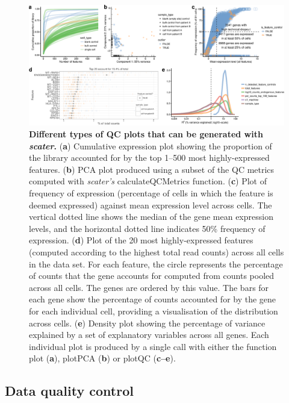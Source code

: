 \documentclass{bioinfo}
\begin{document}
\begin{figure}[!htpb]%
\centerline{\includegraphics[width=\textwidth]{figure3_alt.eps}}
\caption{\textbf{Different types of QC plots that can be generated with \emph{scater}.} (\textbf{a}) Cumulative expression plot showing the proportion of the library accounted for by the top 1--500 most highly-expressed features. (\textbf{b}) PCA plot produced using a subset of the QC metrics computed with \emph{scater's} calculateQCMetrics function. (\textbf{c}) Plot of frequency of expression (percentage of cells in which the feature is deemed expressed) against mean expression level across cells. The vertical dotted line shows the median of the gene mean expression levels, and the horizontal dotted line indicates 50\% frequency of expression. (\textbf{d}) Plot of the 20 most highly-expressed features (computed according to the highest total read counts) across all cells in the data set. For each feature, the circle represents the percentage of counts that the gene accounts for computed from counts pooled across all cells. The genes are ordered by this value. The bars for each gene show the percentage of counts accounted for by the gene for each individual cell, providing a visualisation of the distribution across cells. (\textbf{e}) Density plot showing the percentage of variance explained by a set of explanatory variables across all genes. Each individual plot is produced by a single call with either the function plot (\textbf{a}), plotPCA (\textbf{b}) or plotQC (\textbf{c--e}).}\label{fig:03}
\end{figure}


\subsection{Data quality control}\label{data-quality-control}
\end{document}
